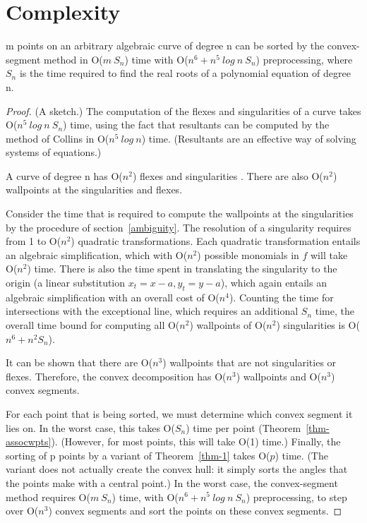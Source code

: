\section{Complexity}
   
\begin{theorem}
m points on an arbitrary algebraic curve of degree n can be sorted by the convex-segment
method in O($m\ S_{n}$) time with O($n^6 + n^5\ log\ n\ S_{n}$) preprocessing, where $S_{n}$ is the time
required to find the real roots of a polynomial equation of degree n.
\end{theorem}
\begin{proof}
(A sketch.)
The computation of the flexes and singularities of a curve takes 
O($n^5\ log\ n\ S_{n}$) time, using the fact that resultants 
can be computed by the method of Collins \cite{col} in O($n^5\ log\ n$) time.
(Resultants are an effective way of solving systems of equations.)

A curve of degree n has O($n^{2}$) flexes and singularities
\cite{wa}.
There are also O($n^{2}$) wallpoints at the 
singularities and flexes.

Consider the time that is required to compute the wallpoints
at the singularities by the procedure of section~\ref{ambiguity}.
The resolution of a singularity requires from 1 to 
O($n^2$) quadratic transformations.
Each quadratic transformation entails an algebraic simplification, which 
with O($n^2$) possible monomials in $f$ will take O($n^2$) time.
There is also the time spent in translating the singularity 
to the origin (a linear substitution $x_{t} = x - a , y_{t} = y - a$), which 
again entails an algebraic simplification with an overall cost of O($n^4$).
Counting the time for intersections with the 
exceptional line, which requires an additional $S_{n}$ time,
the overall time bound for computing all O($n^2$) wallpoints of O($n^2$)
singularities is O($n^6 +n^2 S_{n}$).

It can be shown that there are O($n^{3}$) wallpoints that are not singularities
or flexes.
Therefore, the convex decomposition has O($n^{3}$) wallpoints and
O($n^{3}$) convex segments.

For each point that is being sorted, we must determine which convex
segment it lies on.
In the worst case, this takes O($S_{n}$) time per 
point (Theorem~\ref{thm-assocwpts}).
(However, for most points, this will take O(1) time.)
Finally, the sorting of p points by a variant of Theorem~\ref{thm-1} 
takes O($p$) time.
(The variant does not actually create the convex hull: it simply sorts
the angles that the points make with a central point.)
\hence In the worst case, the convex-segment method requires 
O($m\ S_{n}$) time, with O($n^6 +n^5\ log\ n\ S_{n}$) preprocessing, to step over O($n^{3}$) convex segments
and sort the points on these convex segments.
\end{proof}

